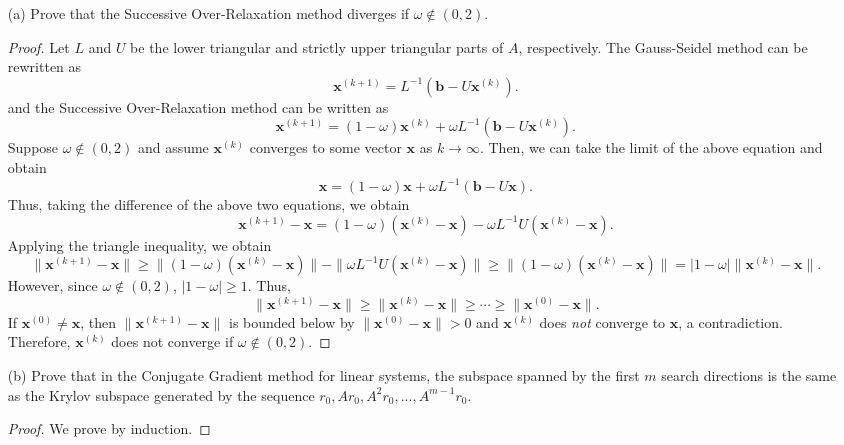 \documentclass[10pt]{article}
\begin{document}
\begin{itemize}

\item[(a)] Prove that the Successive Over-Relaxation method diverges if $ \omega \not\in (0,2) $.

\begin{proof} Let $ L $ and $U$ be the lower triangular and strictly upper triangular parts of $A$, respectively. The Gauss-Seidel method can be rewritten as $$
\mathbf{x}^{(k+1)} = L^{-1} ( \mathbf{b} - U \mathbf{x}^{(k)} ).
$$ and the Successive Over-Relaxation method can be written as $$
\mathbf{x}^{(k+1)} = (1 - \omega) \mathbf{x}^{(k)} + \omega L^{-1} ( \mathbf{b} - U \mathbf{x}^{(k)} ).
$$ Suppose $ \omega \not\in (0,2) $ and assume $ \mathbf{x}^{(k)} $ converges to some vector $ \mathbf{x} $ as $ k \to \infty $. Then, we can take the limit of the above equation and obtain $$
\mathbf{x} = (1 - \omega)\mathbf{x} + \omega L^{-1}( \mathbf{b} - U \mathbf{x} ).
$$ Thus, taking the difference of the above two equations, we obtain $$
\mathbf{x}^{(k+1)} - \mathbf{x}  = (1 - \omega) (  \mathbf{x}^{(k)} - \mathbf{x})  - \omega L^{-1} U ( \mathbf{x}^{(k)} - \mathbf{x} ).
$$ Applying the triangle inequality, we obtain $$
\| \mathbf{x}^{(k+1)} - \mathbf{x} \| \geq \| (1 - \omega) (  \mathbf{x}^{(k)} - \mathbf{x}) \| - \| \omega L^{-1} U ( \mathbf{x}^{(k)} - \mathbf{x} ) \| \geq \| (1 - \omega) (  \mathbf{x}^{(k)} - \mathbf{x}) \| = | 1 - \omega | \|  \mathbf{x}^{(k)} - \mathbf{x} \|.
$$ However, since $ \omega \not\in (0,2) $, $ |1 - \omega| \geq 1 $. Thus, $$
\| \mathbf{x}^{(k+1)} - \mathbf{x} \| \geq  \|  \mathbf{x}^{(k)} - \mathbf{x} \| \geq \cdots \geq \| \mathbf{x}^{(0)} - \mathbf{x} \|.
$$ If $ \mathbf{x}^{(0)} \neq \mathbf{x}  $, then $\| \mathbf{x}^{(k+1)} - \mathbf{x} \|$ is bounded below by $ \| \mathbf{x}^{(0)} - \mathbf{x} \| > 0 $ and $ \mathbf{x}^{(k)} $ does \textit{not} converge to $\mathbf{x}$, a contradiction. Therefore, $ \mathbf{x}^{(k)} $ does not converge if $ \omega \not\in (0,2) $. \end{proof}

\item[(b)] Prove that in the Conjugate Gradient method for linear systems, the subspace spanned by the first $m$ search directions is the same as the Krylov subspace generated by the sequence $ r_0, Ar_0, A^2 r_0, ... ,A^{m-1}r_0 $.

\begin{proof} We prove by induction.


\end{proof}
\end{itemize}
\end{document}
